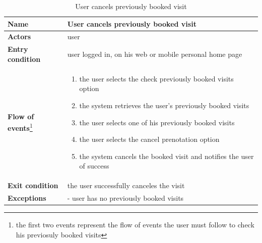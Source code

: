 \begin{table}[h!]
    \centering
    \begin{tabular}{@{}P{0.2\textwidth}P{0.70\textwidth}@{}}
        \toprule
        \textbf{Name}                 & User cancels previously booked visit\\
        \midrule
        \textbf{Actors}               & user\\
        \textbf{Entry condition}      & user logged in, on his web or mobile personal home page\\
        \textbf{Flow of events}\footnote{the first two events represent the flow of events the user must follow to check his previosuly booked visits}       & 
        \begin{enumerate}[nolistsep, leftmargin=*]
            \item the user selects the check previously booked visits option
            \item the system retrieves the user's previously booked visits
            \item the user selects one of his previously booked visits
            \item the user selects the cancel prenotation option
            \item the system cancels the booked visit and notifies the user of success
        \end{enumerate} \\
        \textbf{Exit condition}       & the user successfully canceles the visit\\
        \textbf{Exceptions}           
        & - user has no previously booked visits\\
        \bottomrule
    \end{tabular}
\caption{User cancels previously booked visit}
\label{table:usercancelspreviouslybookedvisit}
\end{table}


